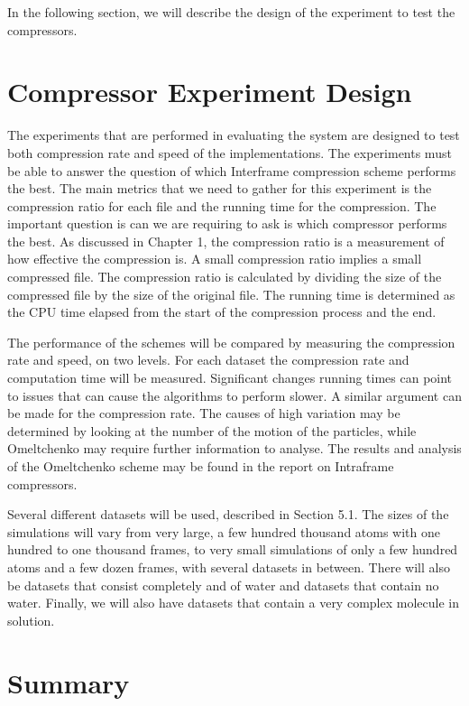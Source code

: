 \documentclass[a4paper,11pt]{report}
\begin{document}
In the following section, we will describe the design of the experiment to test the compressors.

\section{Compressor Experiment Design}

The experiments that are performed in evaluating the system are designed to test both compression rate and speed of the implementations. The experiments must be able to answer the question of which Interframe compression scheme performs the best. The main metrics that we need to gather for this experiment is the compression ratio for each file and the running time for the compression. The important question is can we are requiring to ask is which compressor performs the best. As discussed in Chapter 1, the compression ratio is a measurement of how effective the compression is. A small compression ratio implies a small compressed file. The compression ratio is calculated by dividing the size of the compressed file by the size of the original file. The running time is determined as the CPU time elapsed from the start of the compression process and the end.

The performance of the schemes will be compared by measuring the compression rate and speed, on two levels. For each dataset the compression rate and computation time will be measured. Significant changes running times can point to issues that can cause the algorithms to perform slower. A similar argument can be made for the compression rate. The causes of high variation may be determined by looking at the number of the motion of the particles, while Omeltchenko may require further information to analyse. The results and analysis of the Omeltchenko scheme may be found in the report on Intraframe compressors.

Several different datasets will be used, described in Section 5.1. The sizes of the simulations will vary from very large, a few hundred thousand atoms with one hundred to one thousand frames, to very small simulations of only a few hundred atoms and a few dozen frames, with several datasets in between. There will also be datasets that consist completely and of water and datasets that contain no water. Finally, we will also have datasets that contain a very complex molecule in solution.

\section{Summary}
\end{document}
